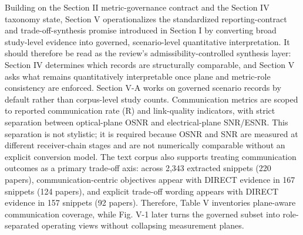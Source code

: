 \markdownRendererInterblockSeparator
{}Building on the Section II metric-governance contract and the Section IV taxonomy state, Section V operationalizes the standardized reporting-contract and trade-off-synthesis promise introduced in Section I by converting broad study-level evidence into governed, scenario-level quantitative interpretation. It should therefore be read as the review's admissibility-controlled synthesis layer: Section IV determines which records are structurally comparable, and Section V asks what remains quantitatively interpretable once plane and metric-role consistency are enforced.\markdownRendererInterblockSeparator
{}\markdownRendererSectionBegin
{}\markdownRendererInterblockSeparator
{}Section V-A works on governed scenario records by default rather than corpus-level study counts. Communication metrics are scoped to reported communication rate (R) and link-quality indicators, with strict separation between optical-plane OSNR and electrical-plane SNR/ESNR. This separation is not stylistic; it is required because OSNR and SNR are measured at different receiver-chain stages and are not numerically comparable without an explicit conversion model. The text corpus also supports treating communication outcomes as a primary trade-off axis: across 2,343 extracted snippets (220 papers), communication-centric objectives appear with DIRECT evidence in 167 snippets (124 papers), and explicit trade-off wording appears with DIRECT evidence in 157 snippets (92 papers). Therefore, Table V inventories plane-aware communication coverage, while Fig. V-1 later turns the governed subset into role-separated operating views without collapsing measurement planes.\markdownRendererParagraphSeparator
{}\markdownRendererInterblockSeparator
{}\markdownRendererInterblockSeparator
